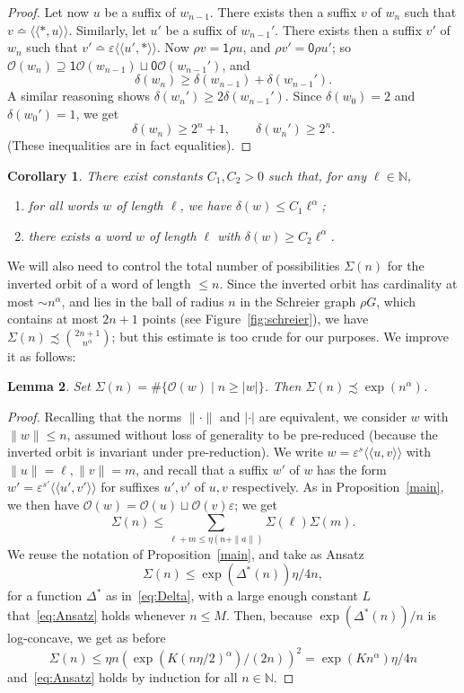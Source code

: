 \documentclass{amsart}
\newcommand\N{\mathbb{N}}
\def\pair<#1>{{\langle\!\langle}#1{\rangle\!\rangle}}
\newtheorem{lemma}{Lemma}[section]
\newtheorem{corollary}[lemma]{Corollary}
\theoremstyle{definition}
\begin{document}
\begin{proof}
  Let now $u$ be a suffix of $w_{n-1}$. There exists then a suffix $v$
  of $w_n$ such that $v\bumpeq\pair<*,u>$. Similarly, let $u'$ be a
  suffix of $w_{n-1}'$. There exists then a suffix $v'$ of $w_n$ such
  that $v'\bumpeq\varepsilon\pair<u',*>$. Now $\rho v=\mathsf1\rho u$,
  and $\rho v'=\mathsf0\rho u'$; so $\mathcal
  O(w_n)\supseteq\mathsf1\mathcal O(w_{n-1})\sqcup\mathsf0\mathcal
  O(w_{n-1}')$, and
  \[\delta(w_n)\ge\delta(w_{n-1})+\delta(w_{n-1}').\]
  A similar reasoning shows $\delta(w_n')\ge2\delta(w_{n-1}')$. Since
  $\delta(w_0)=2$ and $\delta(w_0')=1$, we get
  \[\delta(w_n)\ge2^n+1,\qquad\delta(w_n')\ge2^n.\]
  (These inequalities are in fact equalities).
\end{proof}

\begin{corollary}
  There exist constants $C_1,C_2>0$ such that, for any $\ell\in\N$,
  \begin{enumerate}
  \item for all words $w$ of length $\ell$, we have $\delta(w)\le C_1\ell^\alpha$;
  \item there exists a word $w$ of length $\ell$ with $\delta(w)\ge C_2\ell^\alpha$.
  \end{enumerate}
\end{corollary}

We will also need to control the total number of possibilities
$\Sigma(n)$ for the inverted orbit of a word of length $\le n$. Since
the inverted orbit has cardinality at most $\sim n^\alpha$, and lies
in the ball of radius $n$ in the Schreier graph $\rho G$, which
contains at most $2n+1$ points (see Figure~\ref{fig:schreier}), we
have $\Sigma(n)\precsim\binom{2n+1}{n^\alpha}$; but this estimate is
too crude for our purposes. We improve it as follows:
\begin{lemma}\label{support}
  Set $\Sigma(n)=\#\{\mathcal O(w)\mid n\ge|w|\}$. Then
  $\Sigma(n)\precsim\exp(n^\alpha)$.
\end{lemma}
\begin{proof}
  Recalling that the norms $\|\cdot\|$ and $|\cdot|$ are equivalent,
  we consider $w$ with $\|w\|\le n$, assumed without loss of
  generality to be pre-reduced (because the inverted orbit is invariant
  under pre-reduction). We write $w=\varepsilon^s\pair<u,v>$ with
  $\|u\|=\ell,\|v\|=m$, and recall that a suffix $w'$ of $w$ has the
  form $w'=\varepsilon^{s'}\pair<u',v'>$ for suffixes $u',v'$ of $u,v$
  respectively. As in Proposition~\ref{main}, we then have $\mathcal
  O(w)=\mathcal O(u)\sqcup\mathcal O(v)\varepsilon$; we get
  \[\Sigma(n)\le\sum_{\ell+m\le\eta(n+\|a\|)}\Sigma(\ell)\Sigma(m).\]
  We reuse the notation of Proposition~\ref{main}, and take as Ansatz
  \begin{equation}\label{eq:Ansatz}
    \Sigma(n)\le\exp(\Delta^*(n))\eta/4n,
  \end{equation}
  for a function $\Delta^*$ as in~\eqref{eq:Delta}, with a large
  enough constant $L$ that~\eqref{eq:Ansatz} holds whenever $n\le
  M$. Then, because $\exp(\Delta^*(n))/n$ is log-concave, we get as
  before
  \[\Sigma(n)\le\eta n(\exp(K(n\eta/2)^\alpha)/(2n))^2=\exp(Kn^\alpha)\eta/4n\]
  and~\eqref{eq:Ansatz} holds by induction for all $n\in\N$.
\end{proof}
\end{document}
